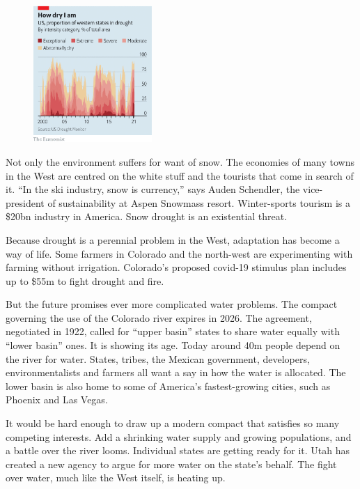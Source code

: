 \documentclass{article}
\begin{document}
\begin{figure}[h]
\centering
\includegraphics[width=0.4\textwidth]{images/20210327_usc266.png}
\end{figure}


Not only the environment suffers for want of snow. The economies of many towns in the West are centred on the white stuff and the tourists that come in search of it. ``In the ski industry, snow is currency,'' says Auden Schendler, the vice-president of sustainability at Aspen Snowmass resort. Winter-sports tourism is a \$20bn industry in America. Snow drought is an existential threat. 

Because drought is a perennial problem in the West, adaptation has become a way of life. Some farmers in Colorado and the north-west are experimenting with farming without irrigation. Colorado's proposed covid-19 stimulus plan includes up to \$55m to fight drought and fire. 

But the future promises ever more complicated water problems. The compact governing the use of the Colorado river expires in 2026. The agreement, negotiated in 1922, called for ``upper basin'' states to share water equally with ``lower basin'' ones. It is showing its age. Today around 40m people depend on the river for water. States, tribes, the Mexican government, developers, environmentalists and farmers all want a say in how the water is allocated. The lower basin is also home to some of America's fastest-growing cities, such as Phoenix and Las Vegas. 

It would be hard enough to draw up a modern compact that satisfies so many competing interests. Add a shrinking water supply and growing populations, and a battle over the river looms. Individual states are getting ready for it. Utah has created a new agency to argue for more water on the state's behalf. The fight over water, much like the West itself, is heating up. {} 
\end{document}
